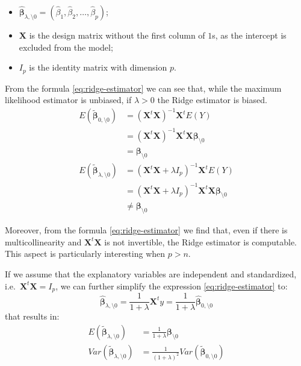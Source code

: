 \documentclass[a4paper, twoside, openright, 12pt]{report}
\providecommand{\tightlist}{%
  \setlength{\itemsep}{0pt}\setlength{\parskip}{0pt}}
\theoremstyle{definition}
\theoremstyle{definition}
\theoremstyle{definition}
\theoremstyle{remark}
\begin{document}
\begin{itemize}
\tightlist
\item
  \(\hat{\boldsymbol{\beta}}_{\lambda,\setminus0} = \left(\hat{\beta}_1, \hat{\beta}_2, \dots, \hat{\beta}_p\right)\);
\item
  \(\boldsymbol{X}\) is the design matrix without the first column of \(1\)s, as the intercept is excluded from the model;
\item
  \(I_p\) is the identity matrix with dimension \(p\).
\end{itemize}

From the formula \eqref{eq:ridge-estimator} we can see that, while the maximum likelihood estimator is unbiased, if \(\lambda>0\) the Ridge estimator is biased.
\begin{align*}
E\left(\tilde{\boldsymbol{\beta}}_{0,\setminus0}\right) & =
\left(\boldsymbol{X}^t\boldsymbol{X}\right)^{-1}\boldsymbol{X}^t E(Y) \\ & =
\left(\boldsymbol{X}^t\boldsymbol{X}\right)^{-1}\boldsymbol{X}^t \boldsymbol{X} \boldsymbol{\beta}_{\setminus0} \\ & =
\boldsymbol{\beta}_{\setminus0} \\[6pt]
E\left(\tilde{\boldsymbol{\beta}}_{\lambda,\setminus0}\right) & =
\left(\boldsymbol{X}^t\boldsymbol{X}+\lambda I_p\right)^{-1}\boldsymbol{X}^t E(Y) \\ & =
\left(\boldsymbol{X}^t\boldsymbol{X}+\lambda I_p\right)^{-1}\boldsymbol{X}^t\boldsymbol{X} \boldsymbol{\beta}_{\setminus0} \\ & \neq
\boldsymbol{\beta}_{\setminus0}
\end{align*}

Moreover, from the formula \eqref{eq:ridge-estimator} we find that, even if there is multicollinearity and \(\boldsymbol{X}^t\boldsymbol{X}\) is not invertible, the Ridge estimator is computable. This aspect is particularly interesting when \(p > n\).

If we assume that the explanatory variables are independent and standardized, i.e.~\(\boldsymbol{X}^t\boldsymbol{X} = I_p\), we can further simplify the expression \eqref{eq:ridge-estimator} to:
\[
\hat{\boldsymbol{\beta}}_{\lambda,\setminus0} =
\frac{1}{1+\lambda} \boldsymbol{X}^t y = 
\frac{1}{1+\lambda} \hat{\boldsymbol{\beta}}_{0,\setminus0}
\]
that results in:
\begin{align*}
E\left(\tilde{\boldsymbol{\beta}}_{\lambda,\setminus0}\right) & =
\frac{1}{1+\lambda} \boldsymbol{\beta}_{\setminus0} \\
Var\left(\tilde{\boldsymbol{\beta}}_{\lambda,\setminus0} \right) & =
\frac{1}{\left(1+\lambda\right)^2} Var\left( \tilde{\boldsymbol{\beta}}_{0,\setminus0} \right)
\end{align*}
\end{document}
